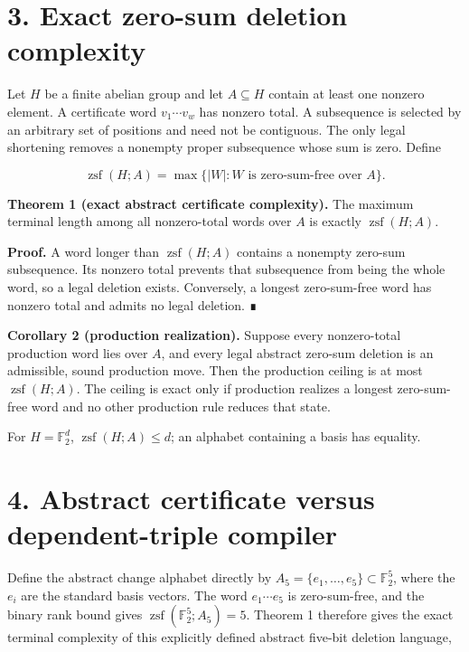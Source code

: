 \documentclass[
  11pt,
]{article}
\begin{document}
\hypertarget{exact-zero-sum-deletion-complexity}{%
\section{3. Exact zero-sum deletion
complexity}\label{exact-zero-sum-deletion-complexity}}

Let \(H\) be a finite abelian group and let \(A\subseteq H\) contain at
least one nonzero element. A certificate word \(v_1\cdots v_w\) has
nonzero total. A subsequence is selected by an arbitrary set of
positions and need not be contiguous. The only legal shortening removes
a nonempty proper subsequence whose sum is zero. Define

\[
\operatorname{zsf}(H; A)
=\max\{|W|:W\text{ is zero-sum-free over }A\}.
\]

\textbf{Theorem 1 (exact abstract certificate complexity).} The maximum
terminal length among all nonzero-total words over \(A\) is exactly
\(\operatorname{zsf}(H; A)\).

\textbf{Proof.} A word longer than \(\operatorname{zsf}(H; A)\) contains
a nonempty zero-sum subsequence. Its nonzero total prevents that
subsequence from being the whole word, so a legal deletion exists.
Conversely, a longest zero-sum-free word has nonzero total and admits no
legal deletion. ∎

\textbf{Corollary 2 (production realization).} Suppose every
nonzero-total production word lies over \(A\), and every legal abstract
zero-sum deletion is an admissible, sound production move. Then the
production ceiling is at most \(\operatorname{zsf}(H; A)\). The ceiling
is exact only if production realizes a longest zero-sum-free word and no
other production rule reduces that state.

For \(H=\mathbb F_2^d\), \(\operatorname{zsf}(H; A)\le d\); an alphabet
containing a basis has equality.

\hypertarget{abstract-certificate-versus-dependent-triple-compiler}{%
\section{4. Abstract certificate versus dependent-triple
compiler}\label{abstract-certificate-versus-dependent-triple-compiler}}

Define the abstract change alphabet directly by
\(A_5=\{e_1,\ldots,e_5\}\subset\mathbb F_2^5\), where the \(e_i\) are
the standard basis vectors. The word \(e_1\cdots e_5\) is zero-sum-free,
and the binary rank bound gives
\(\operatorname{zsf}(\mathbb F_2^5;A_5)=5\). Theorem 1 therefore gives
the exact terminal complexity of this explicitly defined abstract
five-bit deletion language,
\end{document}
